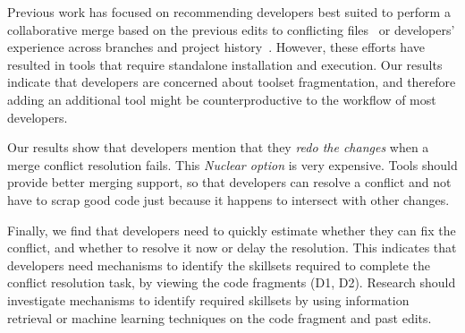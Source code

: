 Previous work has focused on recommending developers best suited to perform a collaborative merge based on the previous edits to conflicting files~\cite{dasilva2015niche} or developers' experience across branches and project history~\cite{CostaSarma}. 
However, these efforts have resulted in tools that require standalone installation and execution. 
Our results indicate that developers are concerned about toolset fragmentation, and therefore adding an additional tool might be counterproductive to the workflow of most developers. 

Our results show that developers mention that they \emph{redo the changes} when a merge conflict resolution fails.
This \emph{Nuclear option} is very expensive.
Tools should provide better merging support, so that developers can resolve a conflict and not have to scrap good code just because it happens to intersect with other changes.

Finally, we find that developers need to quickly estimate whether they can fix the conflict, and whether to resolve it now or delay the resolution. 
This indicates that developers need mechanisms to identify the skillsets required to complete the conflict resolution task, by viewing the code fragments (D1, D2).
Research should investigate mechanisms to identify required skillsets by using information retrieval or machine learning techniques on the code fragment and past edits.
